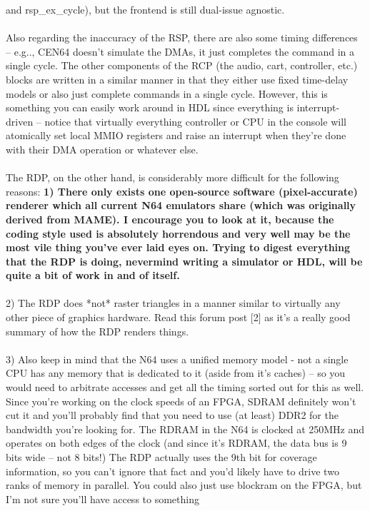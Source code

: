 \documentclass[11pt,a4paper]{article}
\begin{document}
	and rsp\_ex\_cycle), but the frontend is still dual-issue agnostic.\\\\
	Also regarding the inaccuracy of the RSP, there are also some timing
	differences -- e.g.., CEN64 doesn't simulate the DMAs, it just
	completes the command in a single cycle. The other components of the
	RCP (the audio, cart, controller, etc.) blocks are written in a
	similar manner in that they either use fixed time-delay models or also
	just complete commands in a single cycle. However, this is something
	you can easily work around in HDL since everything is interrupt-driven
	-- notice that virtually everything controller or CPU in the console
	will atomically set local MMIO registers and raise an interrupt when
	they're done with their DMA operation or whatever else.\\\\
	The RDP, on the other hand, is considerably more difficult for the
	following reasons:
	\textbf{1) There only exists one open-source software (pixel-accurate)
	renderer which all current N64 emulators share (which was originally
	derived from MAME). I encourage you to look at it, because the coding
	style used is absolutely horrendous and very well may be the most vile
	thing you've ever laid eyes on. Trying to digest everything that the
	RDP is doing, nevermind writing a simulator or HDL, will be quite a
	bit of work in and of itself.}\\\\
	2) The RDP does *not* raster triangles in a manner similar to
	virtually any other piece of graphics hardware. Read this forum post
	[2] as it's a really good summary of how the RDP renders things.\\\\
	3) Also keep in mind that the N64 uses a unified memory model - not a
	single CPU has any memory that is dedicated to it (aside from it's
	caches) -- so you would need to arbitrate accesses and get all the
	timing sorted out for this as well. Since you're working on the clock
	speeds of an FPGA, SDRAM definitely won't cut it and you'll probably
	find that you need to use (at least) DDR2 for the bandwidth you're
	looking for. The RDRAM in the N64 is clocked at 250MHz and operates on
	both edges of the clock (and since it's RDRAM, the data bus is 9 bits
	wide -- not 8 bits!) The RDP actually uses the 9th bit for coverage
	information, so you can't ignore that fact and you'd likely have to
	drive two ranks of memory in parallel. You could also just use
	blockram on the FPGA, but I'm not sure you'll have access to something
\end{document}
